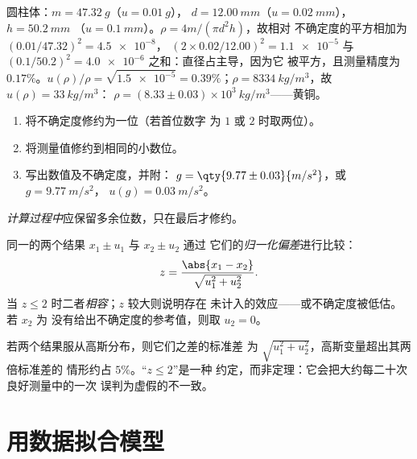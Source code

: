 \begin{example}[圆柱体的密度]\label{ex:b1:units-dimensions:density}
圆柱体：$m = \qty{47.32}{g}$（$u = \qty{0.01}{g}$），
$d = \qty{12.00}{mm}$（$u = \qty{0.02}{mm}$），$h = \qty{50.2}{mm}$
（$u = \qty{0.1}{mm}$）。$\rho = 4m/(\pi d^2 h)$，故相对
不确定度的平方相加为 $(0.01/47.32)^2 = \num{4.5e-8}$，
$(2 \times 0.02/12.00)^2 = \num{1.1e-5}$ 与
$(0.1/50.2)^2 = \num{4.0e-6}$ 之和：直径占主导，因为它
被平方，且测量精度为 $0.17\%$。$u(\rho)/\rho = \sqrt{\num{1.5e-5}}
= 0.39\%$；$\rho = \qty{8334}{kg/m^3}$，故 $u(\rho) = \qty{33}{kg/m^3}$：
$\rho = (8.33 \pm 0.03)\times10^3\ \unit{kg/m^3}$——黄铜。
\end{example}

\begin{method}[写出结果]\label{met:b1:units-dimensions:writing}
\begin{enumerate}
  \item 将不确定度修约为一位（若首位数字
        为 $1$ 或 $2$ 时取两位）。
  \item 将测量值修约到相同的小数位。
  \item 写出数值及不确定度，并附：
        $g = \qty{9.77\pm0.03}{m/s^2}$，或 $g = \qty{9.77}{m/s^2}$，
        $u(g) = \qty{0.03}{m/s^2}$。
\end{enumerate}
\emph{计算过程中}应保留多余位数，只在最后才修约。
\end{method}

\begin{definition}[归一化偏差]\label{def:b1:units-dimensions:zscore}
同一的两个结果 $x_1 \pm u_1$ 与 $x_2 \pm u_2$ 通过
它们的\emph{归一化偏差}进行比较：
\[
z = \frac{\abs{x_1 - x_2}}{\sqrt{u_1^2 + u_2^2}} .
\]
当 $z \leq 2$ 时二者\emph{相容}；$z$ 较大则说明存在
未计入的效应——或不确定度被低估。若 $x_2$ 为
没有给出不确定度的参考值，则取 $u_2 = 0$。
\end{definition}

\begin{remark}[为何取 2]\label{rem:b1:units-dimensions:why2}
若两个结果服从高斯分布，则它们之差的标准差
为 $\sqrt{u_1^2 + u_2^2}$，高斯变量超出其两倍标准差的
情形约占 $5\%$。“$z \leq 2$”是一种
约定，而非定理：它会把大约每二十次良好测量中的一次
误判为虚假的不一致。
\end{remark}

\section{用数据拟合模型}

